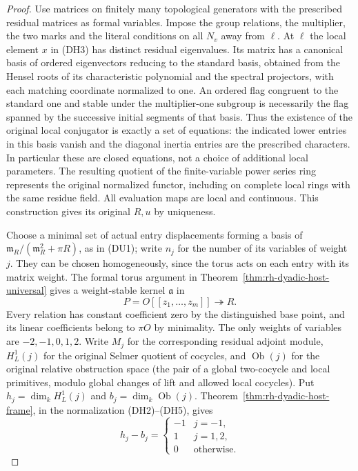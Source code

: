 \begin{proof}
Use matrices on finitely many topological generators with the
prescribed residual matrices as formal variables. Impose the group
relations, the multiplier, the two marks and the literal conditions
on all $N_v$ away from $\ell$. At $\ell$ the local element $x$
in (DH3) has distinct residual eigenvalues. Its matrix has a
canonical basis of ordered eigenvectors reducing to the standard
basis, obtained from the Hensel roots of its characteristic
polynomial and the spectral projectors, with each matching
coordinate normalized to one. An ordered flag congruent to the
standard one and stable under the multiplier-one subgroup is
necessarily the flag spanned by the successive initial segments
of that basis. Thus the existence of the original local conjugator
is exactly a set of equations: the indicated lower entries in
this basis vanish and the diagonal inertia entries are the
prescribed characters. In particular these are closed equations,
not a choice of additional local parameters. The resulting quotient
of the finite-variable power series ring represents the original
normalized functor, including on complete local rings with the
same residue field. All evaluation maps are local and continuous.
This construction gives its original $R,u$ by uniqueness.

Choose a minimal set of actual entry displacements forming a basis
of $\mathfrak m_R/(\mathfrak m_R^2+\pi R)$, as in (DU1);
write $n_j$ for the number of its variables of weight $j$.
They can be chosen homogeneously, since the torus acts on each
entry with its matrix weight. The formal torus argument in
Theorem~\ref{thm:rh-dyadic-host-universal} gives a weight-stable
kernel $\mathfrak a$ in
\[
                   P=O[[z_1,\ldots,z_m]]\twoheadrightarrow R .
\]
Every relation has constant coefficient zero by the distinguished
base point, and its linear coefficients belong to $\pi O$
by minimality. The only weights of variables are $-2,-1,0,1,2$.
Write $M_j$ for the corresponding residual adjoint module,
$H^1_L(j)$ for the original Selmer quotient of cocycles, and
$\operatorname{Ob}(j)$ for the original relative obstruction
space (the pair of a global two-cocycle and local primitives,
modulo global changes of lift and allowed local cocycles).
Put $h_j=\dim_k H^1_L(j)$ and $b_j=\dim_k\operatorname{Ob}(j)$.
Theorem~\ref{thm:rh-dyadic-host-frame}, in the normalization
(DH2)--(DH5), gives
\[
 h_j-b_j=
 \begin{cases}-1&j=-1,\\1&j=1,2,\\0&\text{otherwise}.\end{cases} \tag{DC4}
\]


\end{proof}
